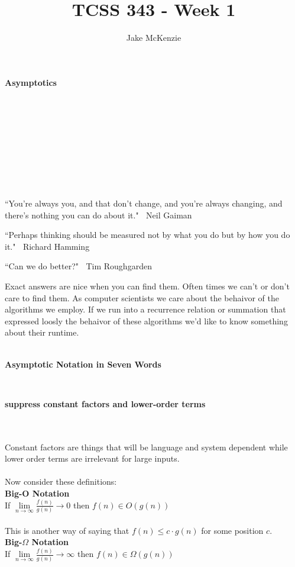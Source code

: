 \documentclass[12pt]{article}
\begin{document}
\title{TCSS 343 - Week 1}
\author{Jake McKenzie}
\maketitle
\noindent\centerline{\textbf{Asymptotics}}\\\\\\\\\\\\\\\\
\begin{center}
    ``You're always you, and that don't change, and you're always changing, and there's nothing you can do about it." $~$ Neil Gaiman
\end{center}
\begin{center}
    ``Perhaps thinking should be measured not by what you do but by how you do it." $~$ Richard Hamming
\end{center}
\begin{center}
    ``Can we do better?" $~$ Tim Roughgarden
\end{center}
    \newpage
Exact answers are nice when you can find them. Often times we can't or don't care to find them. As computer scientists we care about the behaivor of the algorithms we employ. If we run into a recurrence relation or summation that expressed loosly the behaivor of these algorithms we'd like to know something about their runtime.\\\\
\centerline{\textbf{Asymptotic Notation in Seven Words}}\\
\centerline{\textbf{suppress constant factors and lower-order terms}}\\\\
Constant factors are things that will be language and system dependent while lower order terms are irrelevant for large inputs.\\\\
Now consider these definitions:\\
\textbf{Big-O Notation}\\
If $\lim\limits_{n\to\infty}{\frac{f(n)}{g(n)}}\to0$ then $f(n) \in O(g(n))$\\\\
This is another way of saying that $f(n) \leq c \cdot g(n)$ for some position $c$.\\
\textbf{Big-$\Omega$ Notation}\\
If $\lim\limits_{n\to\infty}{\frac{f(n)}{g(n)}}\to\infty$ then $f(n) \in \Omega(g(n))$\\\\
\end{document}

